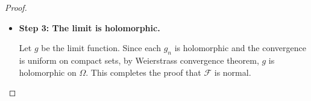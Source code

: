 \documentclass{article}
\theoremstyle{definition}
\begin{document}
\begin{proof}
\begin{itemize}
    On $K_1$, the family $\mathcal{F}$ is uniformly bounded and equicontinuous, so by Arzelà-Ascoli, $(f_n)$ has a subsequence $(f_{n,1})$ converging uniformly on $K_1$.
    On $K_2$, the sequence $(f_{n,1})$ has a subsequence $(f_{n,2})$ converging uniformly on $K_2$.
    Continue this process to get subsequences $(f_{n,j})$ converging uniformly on $K_j$.
    Now consider the diagonal sequence $g_n = f_{n,n}$. This sequence converges uniformly on every $K_j$, hence on every compact subset of $\Omega$.

    \item\textbf{Step 3: The limit is holomorphic.}
    
    Let $g$ be the limit function. Since each $g_n$ is holomorphic and the convergence is uniform on compact sets, by Weierstrass convergence theorem, $g$ is holomorphic on $\Omega$. This completes the proof that $\mathcal{F}$ is normal.
    \end{itemize}
\end{proof}
\end{document}
